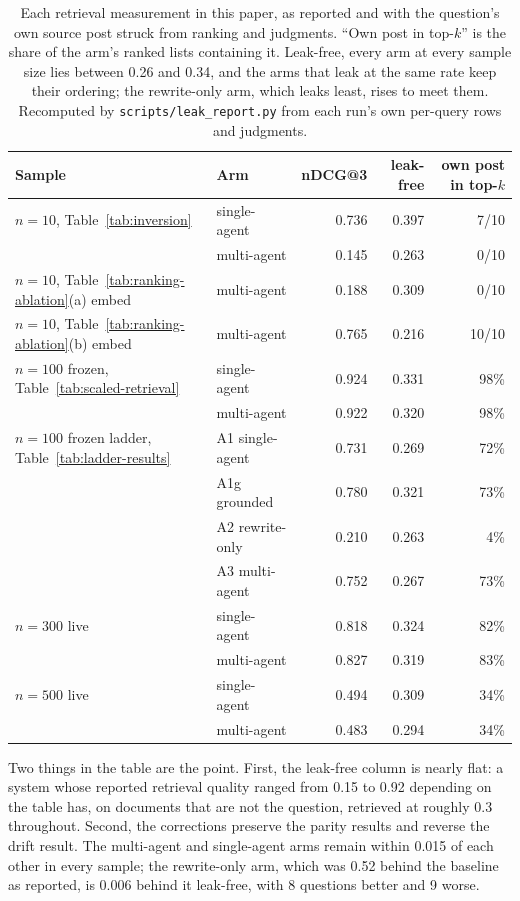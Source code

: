 \documentclass[acmsmall,review,anonymous,screen]{acmart}
\begin{document}
\begin{table}[t]
\caption{Each retrieval measurement in this paper, as reported and with the
question's own source post struck from ranking and judgments. ``Own post in
top-$k$'' is the share of the arm's ranked lists containing it. Leak-free, every
arm at every sample size lies between 0.26 and 0.34, and the arms that leak at
the same rate keep their ordering; the rewrite-only arm, which leaks least,
rises to meet them. Recomputed by \texttt{scripts/leak\_report.py} from each
run's own per-query rows and judgments.}
\label{tab:leak}
\begin{tabular}{llrrr}
\toprule
Sample & Arm & nDCG@3 & leak-free & own post in top-$k$ \\
\midrule
$n=10$, Table~\ref{tab:inversion} & single-agent & 0.736 & 0.397 & 7/10 \\
                                  & multi-agent  & 0.145 & 0.263 & 0/10 \\
$n=10$, Table~\ref{tab:ranking-ablation}(a) embed & multi-agent & 0.188 & 0.309 & 0/10 \\
$n=10$, Table~\ref{tab:ranking-ablation}(b) embed & multi-agent & 0.765 & 0.216 & 10/10 \\
$n=100$ frozen, Table~\ref{tab:scaled-retrieval} & single-agent & 0.924 & 0.331 & 98\% \\
                                                 & multi-agent  & 0.922 & 0.320 & 98\% \\
$n=100$ frozen ladder, Table~\ref{tab:ladder-results} & A1 single-agent & 0.731 & 0.269 & 72\% \\
                                                      & A1g grounded    & 0.780 & 0.321 & 73\% \\
                                                      & A2 rewrite-only & 0.210 & 0.263 & 4\% \\
                                                      & A3 multi-agent  & 0.752 & 0.267 & 73\% \\
$n=300$ live & single-agent & 0.818 & 0.324 & 82\% \\
             & multi-agent  & 0.827 & 0.319 & 83\% \\
$n=500$ live & single-agent & 0.494 & 0.309 & 34\% \\
             & multi-agent  & 0.483 & 0.294 & 34\% \\
\bottomrule
\end{tabular}
\end{table}

Two things in the table are the point. First, the leak-free column is nearly
flat: a system whose reported retrieval quality ranged from 0.15 to 0.92
depending on the table has, on documents that are not the question, retrieved
at roughly 0.3 throughout. Second, the corrections preserve the parity results
and reverse the drift result. The multi-agent and single-agent arms remain
within 0.015 of each other in every sample; the rewrite-only arm, which was 0.52
behind the baseline as reported, is 0.006 behind it leak-free, with 8 questions
better and 9 worse.
\end{document}
